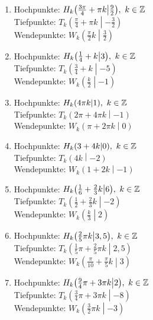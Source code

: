 \begin{Answer}[ref=sincosExtremWendeA1]
	\begin{enumerate}[label=\alph*)]
		\item Hochpunkte: \(H_k\left(\frac{3\pi}{4}+\pi k \middle\vert\frac{9}{2} \right),\ k\in\Z\)\\
		Tiefpunkte: \(T_k\left(\frac{\pi}{4}+\pi k \middle\vert-\frac{3}{2} \right)\)\\
		Wendepunkte: \(W_k\left(\frac{\pi}{2}k \middle\vert\frac{3}{2} \right)\)
		\item Hochpunkte: \(H_k\left(\frac{1}{4}+k \middle\vert 3 \right),\ k\in\Z\)\\
		Tiefpunkte: \(T_k\left(\frac{3}{4}+k \middle\vert -5 \right)\)\\
		Wendepunkte: \(W_k\left(\frac{k}{2} \middle\vert-1 \right)\)
		\item Hochpunkte: \(H_k\left(4\pi k \middle\vert1 \right),\ k\in\Z\)\\
		Tiefpunkte: \(T_k\left(2\pi+4\pi k \middle\vert-1 \right)\)\\
		Wendepunkte: \(W_k\left(\pi+2\pi k \middle\vert0 \right)\)
		\item Hochpunkte: \(H_k\left(3+4k \middle\vert 0\right),\ k\in\Z\)\\
		Tiefpunkte: \(T_k\left(4k \middle\vert-2 \right)\)\\
		Wendepunkte: \(W_k\left(1+2k \middle\vert-1 \right)\)
		\item Hochpunkte: \(H_k\left(\frac{1}{6}+\frac{2}{3}k \middle\vert6 \right),\ k\in\Z\)\\
		Tiefpunkte: \(T_k\left(\frac{1}{2}+\frac{2}{3}k \middle\vert-2 \right)\)\\
		Wendepunkte: \(W_k\left(\frac{k}{3} \middle\vert2 \right)\)
		\item Hochpunkte: \(H_k\left(\frac{2}{5}\pi k \middle\vert3,5 \right),\ k\in\Z\)\\
		Tiefpunkte: \(T_k\left(\frac{1}{5}\pi+\frac{2}{5}\pi k \middle\vert2,5 \right)\)\\
		Wendepunkte: \(W_k\left(\frac{\pi}{10}+\frac{\pi}{5}k \middle\vert3 \right)\)
		\item Hochpunkte: \(H_k\left(\frac{9}{4}\pi+3\pi k \middle\vert 2\right),\ k\in\Z\)\\
		Tiefpunkte: \(T_k\left(\frac{3}{4}\pi+3\pi k \middle\vert -8\right)\)\\
		Wendepunkte: \(W_k\left(\frac{3}{2}\pi k \middle\vert-3 \right)\)

\end{enumerate}
\end{Answer}
